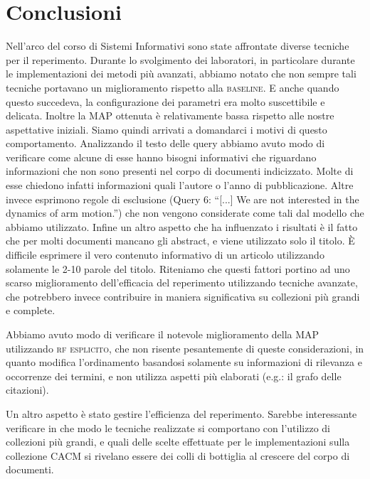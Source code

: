 \documentclass{llncs}
\begin{document}






\section{Conclusioni}
\label{sec:conclusioni}
Nell'arco del corso di Sistemi Informativi sono state affrontate diverse tecniche per il reperimento. Durante lo svolgimento dei laboratori, in particolare durante le implementazioni dei metodi pi\`u avanzati, abbiamo notato che non sempre tali tecniche portavano un miglioramento rispetto alla \textsc{baseline}. E anche quando questo succedeva, la configurazione dei parametri era molto suscettibile e delicata. Inoltre la MAP ottenuta \`e relativamente bassa rispetto alle nostre aspettative iniziali. Siamo quindi arrivati a domandarci i motivi di questo comportamento. Analizzando il testo delle query abbiamo avuto modo di verificare come alcune di esse hanno bisogni informativi che riguardano informazioni che non sono presenti nel corpo di documenti indicizzato. Molte di esse chiedono infatti informazioni quali l'autore o l'anno di pubblicazione. Altre invece esprimono regole di esclusione (Query 6: ``[...] We are not interested in the dynamics of arm motion.'') che non vengono considerate come tali dal modello che abbiamo utilizzato. Infine un altro aspetto che ha influenzato i risultati \`e il fatto che per molti documenti mancano gli abstract, e viene utilizzato solo il titolo. \`E difficile esprimere il vero contenuto informativo di un articolo utilizzando solamente le 2-10 parole del titolo. Riteniamo che questi fattori portino ad uno scarso miglioramento dell'efficacia del reperimento utilizzando tecniche avanzate, che potrebbero invece contribuire in maniera significativa su collezioni pi\`u grandi e complete. 

Abbiamo avuto modo di verificare il notevole miglioramento della MAP utilizzando \textsc{rf esplicito}, che non risente pesantemente di queste considerazioni, in quanto modifica l'ordinamento basandosi solamente su informazioni di rilevanza e occorrenze dei termini, e non utilizza aspetti pi\`u elaborati (e.g.: il grafo delle citazioni).

Un altro aspetto \`e stato gestire l'efficienza del reperimento. Sarebbe interessante verificare in che modo le tecniche realizzate si comportano con l'utilizzo di collezioni pi\`u grandi, e quali delle scelte effettuate per le implementazioni sulla collezione CACM si rivelano essere dei colli di bottiglia al crescere del corpo di documenti.




\end{document}
